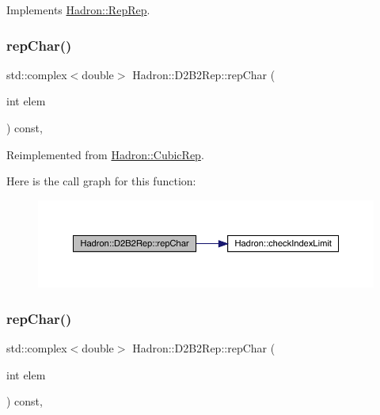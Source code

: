 Implements \mbox{\hyperlink{structHadron_1_1RepRep_ab3213025f6de249f7095892109575fde}{Hadron\+::\+Rep\+Rep}}.

\mbox{\label{structHadron_1_1D2B2Rep_ac6671e025a80770e2dc48904f7e78398}} 
\subsubsection{\texorpdfstring{repChar()}{repChar()}\hspace{0.1cm}{\footnotesize\ttfamily [1/3]}}
{\footnotesize\ttfamily std\+::complex$<$double$>$ Hadron\+::\+D2\+B2\+Rep\+::rep\+Char (\begin{DoxyParamCaption}\item[{int}]{elem }\end{DoxyParamCaption}) const\hspace{0.3cm}{\ttfamily [inline]}, {\ttfamily [virtual]}}



Reimplemented from \mbox{\hyperlink{structHadron_1_1CubicRep_af45227106e8e715e84b0af69cd3b36f8}{Hadron\+::\+Cubic\+Rep}}.

Here is the call graph for this function\+:
\nopagebreak
\begin{figure}[H]
\begin{center}
\leavevmode
\includegraphics[width=350pt]{d3/dbb/structHadron_1_1D2B2Rep_ac6671e025a80770e2dc48904f7e78398_cgraph}
\end{center}
\end{figure}
\mbox{\label{structHadron_1_1D2B2Rep_ac6671e025a80770e2dc48904f7e78398}} 
\subsubsection{\texorpdfstring{repChar()}{repChar()}\hspace{0.1cm}{\footnotesize\ttfamily [2/3]}}
{\footnotesize\ttfamily std\+::complex$<$double$>$ Hadron\+::\+D2\+B2\+Rep\+::rep\+Char (\begin{DoxyParamCaption}\item[{int}]{elem }\end{DoxyParamCaption}) const\hspace{0.3cm}{\ttfamily [inline]}, {\ttfamily [virtual]}}



